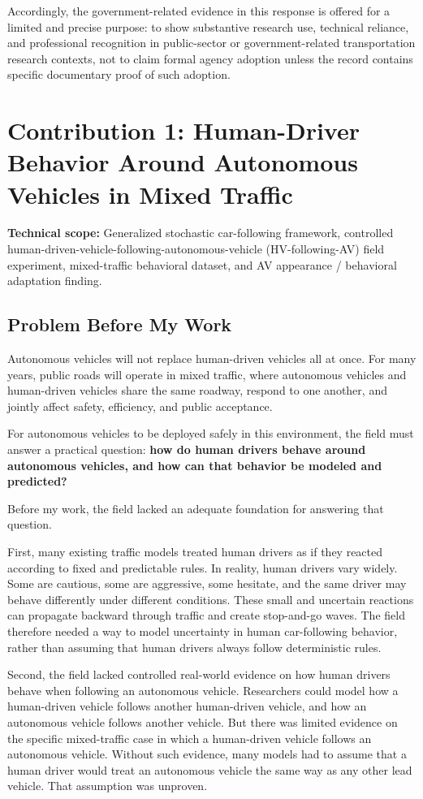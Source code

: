 \documentclass[11pt,letterpaper]{article}
\begin{document}
Accordingly, the government-related evidence in this response is offered for a limited and precise purpose: to show substantive research use, technical reliance, and professional recognition in public-sector or government-related transportation research contexts, not to claim formal agency adoption unless the record contains specific documentary proof of such adoption.

\section{Contribution 1: Human-Driver Behavior Around Autonomous Vehicles in Mixed Traffic}

\textbf{Technical scope:} Generalized stochastic car-following framework, controlled human-driven-vehicle-following-autonomous-vehicle (HV-following-AV) field experiment, mixed-traffic behavioral dataset, and AV appearance / behavioral adaptation finding.

\subsection{Problem Before My Work}

Autonomous vehicles will not replace human-driven vehicles all at once. For many years, public roads will operate in mixed traffic, where autonomous vehicles and human-driven vehicles share the same roadway, respond to one another, and jointly affect safety, efficiency, and public acceptance.

For autonomous vehicles to be deployed safely in this environment, the field must answer a practical question: \textbf{how do human drivers behave around autonomous vehicles, and how can that behavior be modeled and predicted?}

Before my work, the field lacked an adequate foundation for answering that question.

First, many existing traffic models treated human drivers as if they reacted according to fixed and predictable rules. In reality, human drivers vary widely. Some are cautious, some are aggressive, some hesitate, and the same driver may behave differently under different conditions. These small and uncertain reactions can propagate backward through traffic and create stop-and-go waves. The field therefore needed a way to model uncertainty in human car-following behavior, rather than assuming that human drivers always follow deterministic rules.

Second, the field lacked controlled real-world evidence on how human drivers behave when following an autonomous vehicle. Researchers could model how a human-driven vehicle follows another human-driven vehicle, and how an autonomous vehicle follows another vehicle. But there was limited evidence on the specific mixed-traffic case in which a human-driven vehicle follows an autonomous vehicle. Without such evidence, many models had to assume that a human driver would treat an autonomous vehicle the same way as any other lead vehicle. That assumption was unproven.
\end{document}
